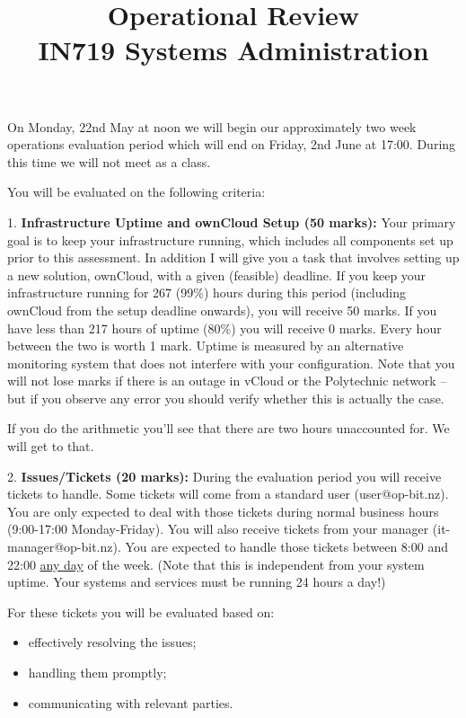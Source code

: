 \documentclass{article}   	%
\title{Operational Review\\ IN719 Systems Administration}
\date{}							%
\begin{document}
\maketitle


On Monday, 22nd May at noon we will begin our approximately two week operations evaluation period which will end on Friday, 2nd June at 17:00.  During this time we will not meet as a class.

You will be evaluated on the following criteria:

\vspace{0.5cm}

1.  \textbf{Infrastructure Uptime and ownCloud Setup (50 marks):}  Your primary goal is to keep your infrastructure running, which includes all components set up prior to this assessment. In addition I will give you a task that involves setting up a new solution, ownCloud, with a given (feasible) deadline.  If you keep your infrastructure running for 267 (99\%) hours during this period (including ownCloud from the setup deadline onwards), you will receive 50 marks.  If you have less than 217 hours of uptime (80\%) you will receive 0 marks.  Every hour between the two is worth 1 mark.  Uptime is measured by an alternative monitoring system that does not interfere with your configuration.  Note that you will not lose marks if there is an outage in vCloud or the Polytechnic network -- but if you observe any error you should verify whether this is actually the case.

If you do the arithmetic you'll see that there are two hours unaccounted for.  We will get to that.

\vspace{0.5cm}

2.  \textbf{Issues/Tickets (20 marks):}  During the evaluation period you will receive tickets to handle.  Some tickets will come from a standard user (user@op-bit.nz).  You are only expected to deal with those tickets during normal business hours (9:00-17:00 Monday-Friday).  You will also receive tickets from your manager (it-manager@op-bit.nz).  You are expected to handle those tickets between 8:00 and 22:00 \underline{any day} of the week. (Note that this is independent from your system uptime. Your systems and services must be running 24 hours a day!) 

For these tickets you will be evaluated based on:

\begin{itemize}
\item effectively resolving the issues;
\item handling them promptly;
\item communicating with relevant parties.
\end{itemize}
\end{document}
